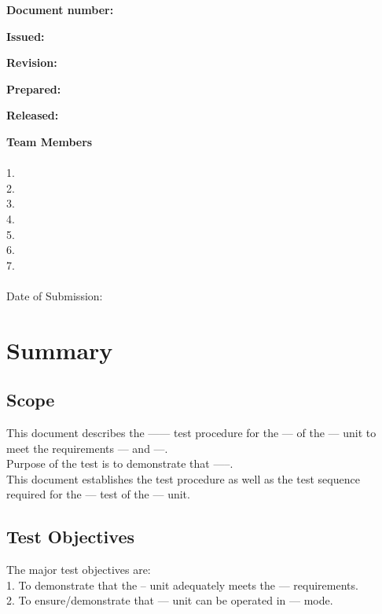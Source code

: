 \documentclass[12pt,a4paper,numbers=endperiod]{article}
\begin{document}
\noindent
\thispagestyle{empty}
	\par \vspace{0.5cm}
{\Large \bf Document number:}\\
\par \vspace{0.3cm}
{\Large \bf Issued:}\\
\par \vspace{0.3cm}
{\Large \bf Revision:}\\
\par \vspace{0.3cm}	
{\Large \bf Prepared:}\\
\par \vspace{0.3cm}
{\Large \bf Released:}\\
\par \vspace{0.5cm}
{\Huge \bf Team Members}\\
 \\
1.\\
2.\\
3.\\
4.\\
5.\\
6.\\
7.\\
\vspace*{\fill} \\
Date of Submission:
\newpage

\tableofcontents
\newpage

\listoffigures
\listoftables
\newpage

\section{Summary}
\subsection{Scope}
This document describes the ------ test procedure for the --- of the --- unit to meet the requirements --- and ---.\\
Purpose of the test is to demonstrate that -----.\\
This document establishes the test procedure as well as the test sequence required for the --- test of the --- unit.\\
\subsection{Test Objectives}
The major test objectives are:\\
1. To demonstrate that the -- unit adequately meets the --- requirements.\\
2. To ensure/demonstrate that --- unit can be operated in --- mode.
\end{document}
